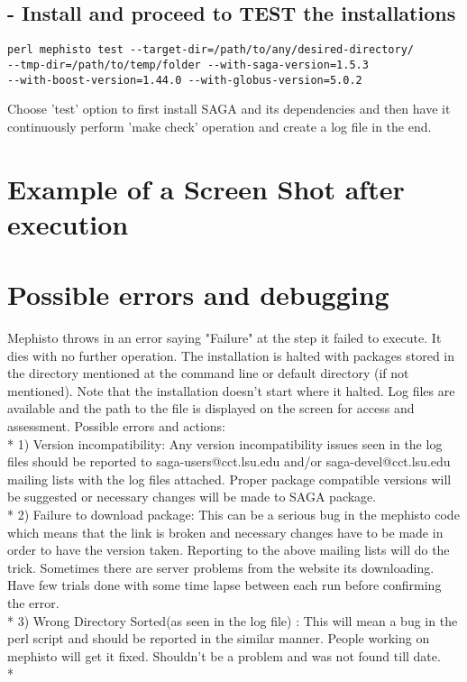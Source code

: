 \documentclass[a4paper,10pt]{article}
\begin{document}
\subsection*{- Install and proceed to TEST the installations}
\begin{verbatim}
perl mephisto test --target-dir=/path/to/any/desired-directory/ 
--tmp-dir=/path/to/temp/folder --with-saga-version=1.5.3 
--with-boost-version=1.44.0 --with-globus-version=5.0.2
\end{verbatim}
Choose 'test' option to first install SAGA and its dependencies and then have it
continuously perform 'make check' operation and create a log file in the end.

\section*{Example of a Screen Shot after execution}

\section*{Possible errors and debugging} 
Mephisto throws in an error saying "Failure" at the step it failed to execute. 
It dies with no further operation. The installation is halted with packages stored 
in the directory mentioned at the command line or default directory (if not mentioned).
Note that the installation doesn't start where it halted. Log files are available and the
path to the file is displayed on the screen for access and assessment. 
Possible errors and actions: \\*
1) Version incompatibility: Any version incompatibility issues seen in the 
log files should be reported to saga-users@cct.lsu.edu and/or 
saga-devel@cct.lsu.edu mailing lists with the log files attached. 
Proper package compatible versions will be suggested or necessary changes 
will be made to SAGA package.\\*
2) Failure to download package: This can be a serious bug in the mephisto code which means 
that the link is broken and necessary changes have to be made in order to have the version
taken. Reporting to the above mailing lists will do the trick. Sometimes there are server
problems from the website its downloading. Have few trials done with some time
lapse between each run before confirming the error. \\*
3) Wrong Directory Sorted(as seen in the log file) : This will mean a bug in the perl script 
and should be reported in the similar manner. People working on mephisto will get it fixed. 
Shouldn't be a problem and was not found till date. \\*

 
  
 
\end{document}
